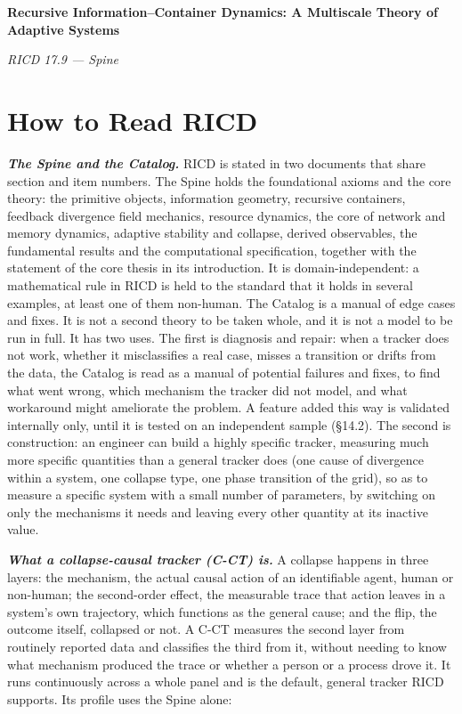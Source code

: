 \documentclass[
]{article}
\author{}
\date{}
\begin{document}
\textbf{Recursive Information--Container Dynamics: A Multiscale Theory
of Adaptive Systems}

\emph{RICD 17.9 --- Spine}

\hypertarget{how-to-read-ricd}{%
\section{How to Read RICD}\label{how-to-read-ricd}}

\emph{\textbf{The Spine and the Catalog.}} RICD is stated in two
documents that share section and item numbers. The Spine holds the
foundational axioms and the core theory: the primitive objects,
information geometry, recursive containers, feedback divergence field
mechanics, resource dynamics, the core of network and memory dynamics,
adaptive stability and collapse, derived observables, the fundamental
results and the computational specification, together with the statement
of the core thesis in its introduction. It is domain-independent: a
mathematical rule in RICD is held to the standard that it holds in
several examples, at least one of them non-human. The Catalog is a
manual of edge cases and fixes. It is not a second theory to be taken
whole, and it is not a model to be run in full. It has two uses. The
first is diagnosis and repair: when a tracker does not work, whether it
misclassifies a real case, misses a transition or drifts from the data,
the Catalog is read as a manual of potential failures and fixes, to find
what went wrong, which mechanism the tracker did not model, and what
workaround might ameliorate the problem. A feature added this way is
validated internally only, until it is tested on an independent sample
(§14.2). The second is construction: an engineer can build a highly
specific tracker, measuring much more specific quantities than a general
tracker does (one cause of divergence within a system, one collapse
type, one phase transition of the grid), so as to measure a specific
system with a small number of parameters, by switching on only the
mechanisms it needs and leaving every other quantity at its inactive
value.

\emph{\textbf{What a collapse-causal tracker (C-CT) is.}} A collapse
happens in three layers: the mechanism, the actual causal action of an
identifiable agent, human or non-human; the second-order effect, the
measurable trace that action leaves in a system's own trajectory, which
functions as the general cause; and the flip, the outcome itself,
collapsed or not. A C-CT measures the second layer from routinely
reported data and classifies the third from it, without needing to know
what mechanism produced the trace or whether a person or a process drove
it. It runs continuously across a whole panel and is the default,
general tracker RICD supports. Its profile uses the Spine alone:
\end{document}
